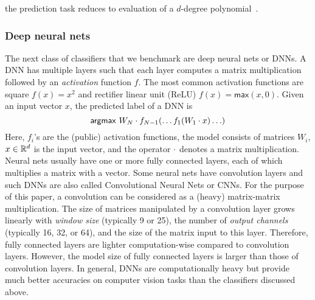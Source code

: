 the prediction task
reduces to evaluation of a $d$-degree polynomial~\cite{shafindss}.

\subsubsection*{Deep neural nets}
The next class of classifiers that we benchmark are deep neural nets
or DNNs. A DNN has multiple layers such that each layer computes a
matrix
multiplication followed by an {\it activation} function $f$. The most
common activation functions are square $f(x)=x^2$ and rectifier linear
unit (ReLU) $f(x)=\mathsf{max}(x,0)$.
Given an input vector $x$, the predicted label of a DNN is
\[
 \mathsf{argmax}\ W_N\cdot f_{N-1}(\ldots f_1(W_1\cdot x)\ldots)
\]
Here, $f_i$'s are the (public) activation functions, the model
consists of matrices $W_i$,  $x \in {\mathbb{R}}^d$ is the input vector, and the
operator $\cdot$ denotes a matrix multiplication.
Neural nets usually have one or more fully connected layers, each of
which multiplies a matrix with a vector.
Some neural nets have convolution layers and such DNNs are also called
Convolutional Neural Nets or CNNs.
For the purpose of this paper, a convolution can be considered as a
(heavy) matrix-matrix multiplication. The size of matrices manipulated
by a convolution layer grows linearly with {\it window size}
(typically 9 or 25), the number of {\it output channels} (typically
16, 32, or 64), and the size of the matrix input to this layer.
Therefore, fully connected layers are lighter computation-wise compared
to convolution layers. However, the model size  of fully connected
layers is larger than those of convolution layers.
In general, DNNs are computationally heavy but provide
much better accuracies on computer vision tasks than the classifiers
discussed above.

